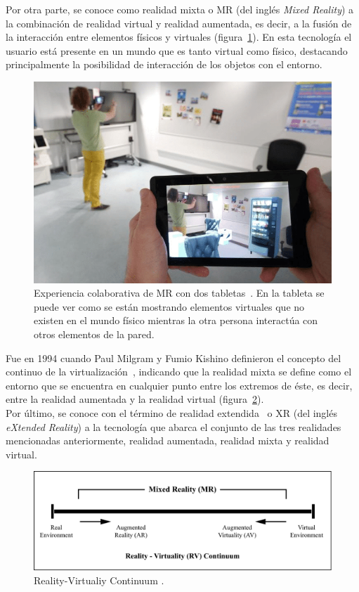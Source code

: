 

Por otra parte, se conoce como realidad mixta o MR (del inglés \textit{Mixed Reality}) a la combinación de realidad virtual y realidad aumentada, es decir, a la fusión de la interacción entre elementos físicos y virtuales (figura~\ref{fig:mrdefinitionexample}). En esta tecnología el usuario está presente en un mundo que es tanto virtual como físico, destacando principalmente la posibilidad de interacción de los objetos con el entorno.\\

\begin{figure}[H]
    \centering
    \includegraphics[scale=0.3]{Images/Estado del arte/mrexampledefinition.png}
    \caption{Experiencia colaborativa de MR con dos tabletas~\cite{mrExampleDefinition}. En la tableta se puede ver como se están mostrando elementos virtuales que no existen en el mundo físico mientras la otra persona interactúa con otros elementos de la pared.}
    \label{fig:mrdefinitionexample}
\end{figure}

Fue en 1994 cuando Paul Milgram y Fumio Kishino definieron el concepto del continuo de la virtualización~\cite{ARDisplayofContinuum}, indicando que la realidad mixta se define como el entorno que se encuentra en cualquier punto entre los extremos de éste, es decir, entre la realidad aumentada y la realidad virtual (figura~\ref{fig:rvcontinuumfig}).\\


Por último, se conoce con el término de realidad extendida~\cite{xrintro} o XR (del inglés \textit{eXtended Reality}) a la tecnología que abarca el conjunto de las tres realidades mencionadas anteriormente, realidad aumentada, realidad mixta y realidad virtual.  

\begin{figure}[htbp]
\centering
    \includegraphics[scale=0.7]{Images/Estado del arte/rvcontinuum.pdf}
    \caption{Reality-Virtualiy Continuum \cite{ARDisplayofContinuum}.}
    \label{fig:rvcontinuumfig}
\end{figure}






